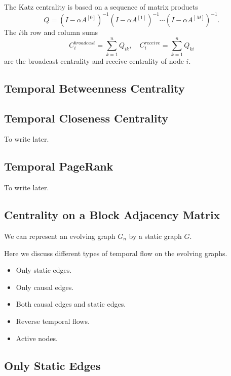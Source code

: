 \documentclass[12pt]{article}
\theoremstyle{definition}
\begin{document}
The Katz centrality is based on a sequence of matrix products
\begin{equation}
\label{eq:katz}
Q = (I - \alpha A^{[0]})^{-1}(I - \alpha A^{[1]})^{-1} \cdots (I - \alpha A^{[M]})^{-1}.
\end{equation}
The $i$th row and column sums
$$
C_i^{broadcast} = \sum_{k=1}^n Q_{ik}, \quad C_i^{receive} = \sum_{k=1}^n Q_{ki}
$$
are the broadcast centrality and receive centrality of node $i$.

\subsection{Temporal Betweenness Centrality}
\label{sec:temp-betw-centr}



\subsection{Temporal Closeness Centrality}
\label{sec:temp-clos-centr}

To write later.

\subsection{Temporal PageRank}
\label{sec:temporal-pagerank}

To write later.

\subsection{Centrality on a Block Adjacency Matrix}
\label{sec:centr-block-adjac}

We can represent an evolving graph $G_n$ by a static graph $G$.

Here we discuss different types of temporal flow on the evolving graphs.
\begin{itemize}
\item Only static edges.
\item Only causal edges.
\item Both causal edges and static edges.
\item Reverse temporal flows.
\item Active nodes.
\end{itemize}

\subsection{Only Static Edges}
\label{sec:only-static-edges}
\end{document}
